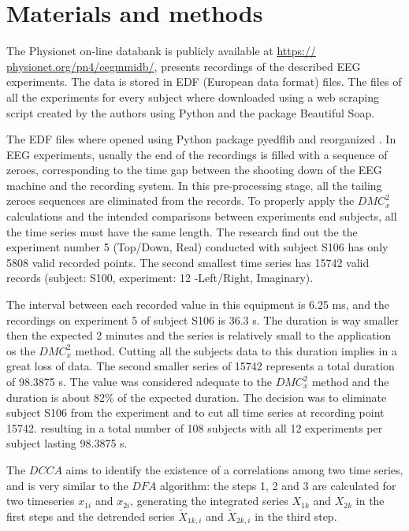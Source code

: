 \documentclass[10pt,letterpaper]{article}
\newcommand{\dmc}{\(DMC_x^2\) }
\begin{document}
\section*{Materials and methods}

The Physionet on-line databank is publicly available at \url{https:// physionet.org/pn4/eegmmidb/}, presents recordings of the described EEG experiments. The data is stored in EDF (European data format) files. The files of all the experiments for every subject where downloaded using a web scraping script created by the authors using Python and the package Beautiful Soap.

The EDF files where opened using Python package pyedflib and reorganized . In EEG experiments, usually the end of the recordings is filled with a sequence of zeroes, corresponding to the time gap between the shooting down of the EEG machine and the recording system. In this pre-processing stage, all the tailing zeroes sequences are eliminated from the records. To properly apply the \dmc calculations and the intended comparisons between experiments end subjects, all the time series must have the same length. The research find out the the	experiment number 5	(Top/Down, Real) conducted with subject S106 has only 5808 valid recorded points. The second smallest time series has 15742 valid records (subject: S100, experiment: 12	-Left/Right,	Imaginary).

The interval between each recorded value in this equipment is 6.25 ms, and the recordings on experiment 5 of subject S106 is 36.3 s. The duration is way smaller then the expected 2 minutes and the series is relatively small to the application os the \dmc method. Cutting all the subjects data to this duration implies in a great loss of data. The second smaller series of 15742 represents a total duration of 98.3875 s. The value was considered adequate to the \dmc method and the duration is about 82\% of the expected duration. The decision was to eliminate subject S106 from the experiment and to cut all time series at recording point 15742. resulting in a total number of 108 subjects with all 12 experiments per subject lasting 98.3875 s.

The \(DCCA\) aims to identify the existence of a correlations among two time series, and is very similar to the \(DFA\) algorithm: the steps 1, 2 and 3 are calculated for two timeseries \(x_{1i}\) and \(x_{2i}\), generating the integrated series \(X_{1k}\) and \(X_{2k}\) in the first steps and the detrended series \(\widetilde{X}_{1k, i}\) and \(\widetilde{X}_{2k, i}\) in the third step.
\end{document}

